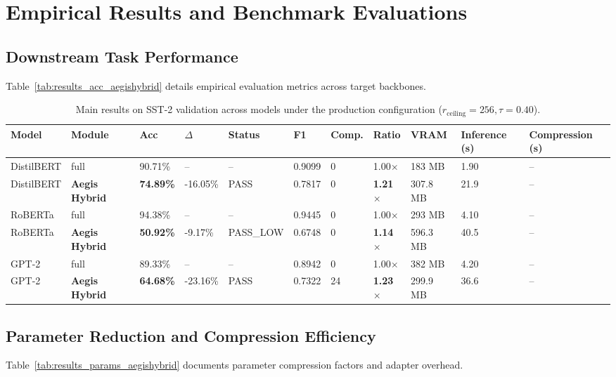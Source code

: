 \section{Empirical Results and Benchmark Evaluations}

\subsection{Downstream Task Performance}
Table~\ref{tab:results_acc_aegishybrid} details empirical evaluation metrics across target backbones.

\begin{table}[t]
\centering
\small
\begin{tabular}{lllllllllll}
\toprule
\textbf{Model} & \textbf{Module} & \textbf{Acc} & \textbf{$\Delta$} & \textbf{Status} & \textbf{F1} & \textbf{Comp.} & \textbf{Ratio} & \textbf{VRAM} & \textbf{Inference (s)} & \textbf{Compression (s)} \\
\midrule
DistilBERT & full & 90.71\% & -- & -- & 0.9099 & 0 & 1.00$\times$ & 183 MB & 1.90 & -- \\
DistilBERT & \textbf{Aegis Hybrid} & \textbf{74.89\%} & -16.05\% & PASS & 0.7817 & 0 & \textbf{1.21$\times$} & 307.8 MB & 21.9 & -- \\
RoBERTa & full & 94.38\% & -- & -- & 0.9445 & 0 & 1.00$\times$ & 293 MB & 4.10 & -- \\
RoBERTa & \textbf{Aegis Hybrid} & \textbf{50.92\%} & -9.17\% & PASS\_LOW & 0.6748 & 0 & \textbf{1.14$\times$} & 596.3 MB & 40.5 & -- \\
GPT-2 & full & 89.33\% & -- & -- & 0.8942 & 0 & 1.00$\times$ & 382 MB & 4.20 & -- \\
GPT-2 & \textbf{Aegis Hybrid} & \textbf{64.68\%} & -23.16\% & PASS & 0.7322 & 24 & \textbf{1.23$\times$} & 299.9 MB & 36.6 & -- \\
\bottomrule
\end{tabular}
\caption{Main results on SST-2 validation across models under the production configuration ($r_{\mathrm{ceiling}}=256, \tau=0.40$).}
\label{tab:main_sst2}
\end{table}

\subsection{Parameter Reduction and Compression Efficiency}
Table~\ref{tab:results_params_aegishybrid} documents parameter compression factors and adapter overhead.

